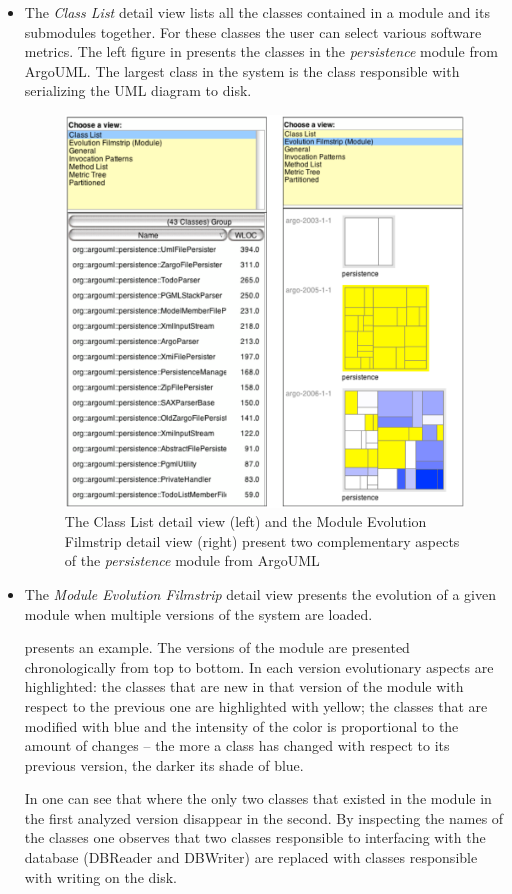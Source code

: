 \documentclass[preprint,12pt]{elsarticle}
\begin{document}
\begin{itemize}

\item The {\em Class List} detail view lists all the classes contained in a module and its submodules together. For these classes the user can select various software metrics. The left figure in  presents the classes in the {\em persistence} module from ArgoUML. The largest class in the system is the class responsible with serializing the UML diagram to disk.

\begin{figure}[h]
\begin{center}
\includegraphics[width=0.8\linewidth]{images/ModuleDetails}
\caption{The Class List detail view (left) and the Module Evolution Filmstrip detail view (right) present two complementary aspects of the {\em persistence} module from ArgoUML} 
\end{center}
\end{figure}

\item The {\em Module Evolution Filmstrip} detail view presents the evolution of a given module when multiple versions of the system are loaded. 

 presents an example. The versions of the module are presented chronologically from top to bottom. In each version evolutionary aspects are highlighted: the classes that are new in that version of the module with respect to the previous one are highlighted with yellow; the classes that are modified with blue and the intensity of the color is proportional to the amount of changes -- the more a class has changed with respect to its previous version, the darker its shade of blue. 

In  one can see that where the only two classes that existed in the module in the first analyzed version disappear in the second. By inspecting the names of the classes one observes that two classes responsible to interfacing with the database (DBReader and DBWriter) are replaced with classes responsible with writing on the disk.
\end{itemize}
\end{document}
